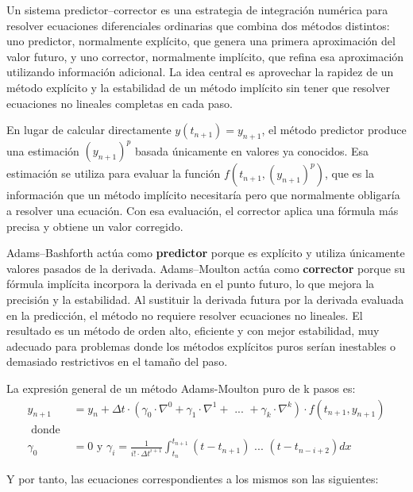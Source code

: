 Un sistema predictor–corrector es una estrategia de integración numérica para resolver ecuaciones diferenciales ordinarias que combina dos métodos distintos: uno predictor, normalmente explícito, que genera una primera aproximación del valor futuro, y uno corrector, normalmente implícito, que refina esa aproximación utilizando información adicional\cite{Burden2016}. La idea central es aprovechar la rapidez de un método explícito y la estabilidad de un método implícito sin tener que resolver ecuaciones no lineales completas en cada paso.

En lugar de calcular directamente $y(t_{n+1})=y_{n+1}$, el método predictor produce una estimación $(y_{n+1})^p$ basada únicamente en valores ya conocidos. Esa estimación se utiliza para evaluar la función $f(t_{n+1}, (y_{n+1})^p)$, que es la información que un método implícito necesitaría pero que normalmente obligaría a resolver una ecuación. Con esa evaluación, el corrector aplica una fórmula más precisa y obtiene un valor corregido.

Adams–Bashforth actúa como \textbf{predictor} porque es explícito y utiliza únicamente valores pasados de la derivada. Adams–Moulton actúa como \textbf{corrector} porque su fórmula implícita incorpora la derivada en el punto futuro, lo que mejora la precisión y la estabilidad. Al sustituir la derivada futura por la derivada evaluada en la predicción, el método no requiere resolver ecuaciones no lineales. El resultado es un método de orden alto, eficiente y con mejor estabilidad, muy adecuado para problemas donde los métodos explícitos puros serían inestables o demasiado restrictivos en el tamaño del paso.

La expresión general de un método Adams-Moulton puro de k pasos es: \cite{Molero2007}
\begin{equation}
	\label{eq:ExpresionGeneralAdamsMoulton}
	\begin{split}
		y_{n+1} &= y_n + \Delta t \cdot ( \gamma_0 \cdot \nabla^0 + \gamma_1 \cdot \nabla^1 + \text{ ... } + \gamma_k \cdot \nabla^k )\cdot f(t_{n+1},y_{n+1}) \\
		\text{ donde } \\
		\gamma_0 &= 0 \text{ y } \gamma_i = \frac{1}{i!\cdot \Delta t^{i+1}} \int_{t_n}^{t_{n+1}} (t-t_{n+1}) \text{ ... } (t - t_{n-i+2}) dx
	\end{split}
\end{equation}


Y por tanto, las ecuaciones correspondientes a los mismos son las siguientes:\cite{Segarra-Escandon2020}

